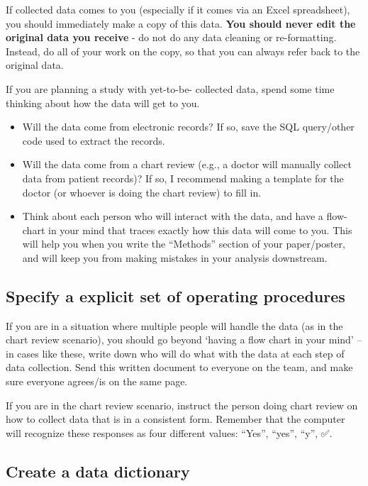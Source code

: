 \documentclass[
]{book}
\begin{document}
If collected data comes to you (especially if it comes via an Excel spreadsheet), you should immediately make a copy of this data. \textbf{You should never edit the original data you receive} - do not do any data cleaning or re-formatting. Instead, do all of your work on the copy, so that you can always refer back to the original data.

If you are planning a study with yet-to-be- collected data, spend some time thinking about how the data will get to you.

\begin{itemize}
\item
  Will the data come from electronic records? If so, save the SQL query/other code used to extract the records.
\item
  Will the data come from a chart review (e.g., a doctor will manually collect data from patient records)? If so, I recommend making a template for the doctor (or whoever is doing the chart review) to fill in.
\item
  Think about each person who will interact with the data, and have a flow-chart in your mind that traces exactly how this data will come to you. This will help you when you write the ``Methods'' section of your paper/poster, and will keep you from making mistakes in your analysis downstream.
\end{itemize}

\hypertarget{specify-a-explicit-set-of-operating-procedures}{%
\subsection{Specify a explicit set of operating procedures}\label{specify-a-explicit-set-of-operating-procedures}}

If you are in a situation where multiple people will handle the data (as in the chart review scenario), you should go beyond `having a flow chart in your mind' -- in cases like these, write down who will do what with the data at each step of data collection. Send this written document to everyone on the team, and make sure everyone agrees/is on the same page.

If you are in the chart review scenario, instruct the person doing chart review on how to collect data that is in a consistent form. Remember that the computer will recognize these responses as four different values: ``Yes'', ``yes'', ``y'', ✅.

\hypertarget{create-a-data-dictionary}{%
\subsection{Create a data dictionary}\label{create-a-data-dictionary}}
\end{document}

